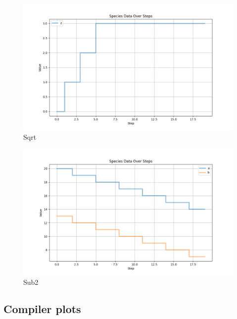 \begin{figure}[H]
    \centering
    \includegraphics[width=\textwidth]{report/figures/InterpreterPlots/sqrtInt.png}
    \caption{Sqrt}
\end{figure}

\begin{figure}[H]
    \centering
    \includegraphics[width=\textwidth]{report/figures/InterpreterPlots/sub2Int.png}
    \caption{Sub2}
\end{figure}




\subsection{Compiler plots}\label{sec:compiler_plots}

